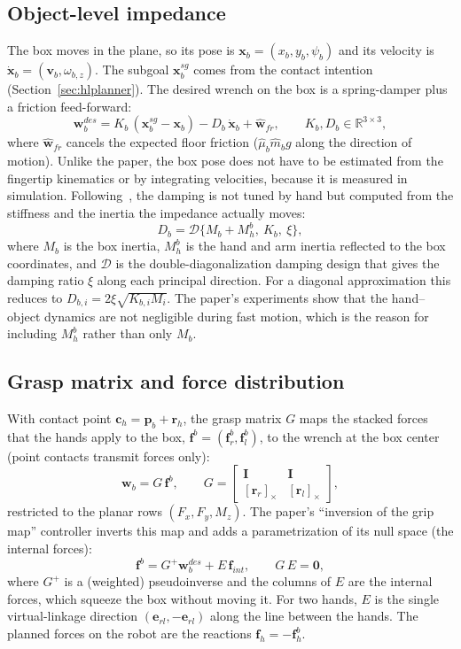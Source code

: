 \documentclass[11pt]{article}
\theoremstyle{remark}
\theoremstyle{definition}
\newcommand{\R}{\mathbb{R}}
\newcommand{\f}{\bm{f}}
\newcommand{\p}{\bm{p}}
\newcommand{\cc}{\bm{c}}
\newcommand{\I}{\bm{I}}
\newcommand{\zero}{\bm{0}}
\newcommand{\skewm}[1]{[#1]_\times}
\begin{document}
\subsection{Object-level impedance}
The box moves in the plane, so its pose is $\bm x_b=(x_b,y_b,\psi_b)$ and its velocity is
$\dot{\bm x}_b=(\bm v_b,\omega_{b,z})$. The subgoal $\bm x_b^{sg}$ comes from the contact intention
(Section~\ref{sec:hlplanner}). The desired wrench on the box is a spring-damper plus a friction feed-forward:
\begin{equation}
  \bm w_b^{des}=K_b\,(\bm x_b^{sg}-\bm x_b)-D_b\,\dot{\bm x}_b+\hat{\bm w}_{fr},
  \qquad K_b,D_b\in\R^{3\times3},
  \label{eq:objimp}
\end{equation}
where $\hat{\bm w}_{fr}$ cancels the expected floor friction ($\hat\mu_b\hat m_b g$ along the direction of motion).
Unlike the paper, the box pose does not have to be estimated from the fingertip kinematics or by integrating
velocities, because it is measured in simulation. Following~\cite{wimbock2012}, the damping is not tuned by hand but
computed from the stiffness and the inertia the impedance actually moves:
\begin{equation}
  D_b=\mathcal D\{M_b+M_h^b,\ K_b,\ \xi\},
\end{equation}
where $M_b$ is the box inertia, $M_h^b$ is the hand and arm inertia reflected to the box coordinates, and $\mathcal D$
is the double-diagonalization damping design that gives the damping ratio $\xi$ along each principal direction. For a
diagonal approximation this reduces to $D_{b,i}=2\xi\sqrt{K_{b,i}M_i}$. The paper's experiments show that the
hand--object dynamics are not negligible during fast motion, which is the reason for including $M_h^b$ rather than only $M_b$.

\subsection{Grasp matrix and force distribution}
With contact point $\cc_h=\p_b+\bm r_h$, the grasp matrix $G$ maps the stacked forces that the hands apply to the box,
$\bm f^b=(\bm f_r^b,\bm f_l^b)$, to the wrench at the box center (point contacts transmit forces only):
\begin{equation}
  \bm w_b=G\,\bm f^b,\qquad
  G=\begin{bmatrix}\I & \I\\ \skewm{\bm r_r} & \skewm{\bm r_l}\end{bmatrix},
\end{equation}
restricted to the planar rows $(F_x,F_y,M_z)$. The paper's ``inversion of the grip map'' controller inverts this map
and adds a parametrization of its null space (the internal forces):
\begin{equation}
  \bm f^b=G^+\bm w_b^{des}+E\,\bm f_{int},\qquad G\,E=\zero,
  \label{eq:gripinv}
\end{equation}
where $G^+$ is a (weighted) pseudoinverse and the columns of $E$ are the internal forces, which squeeze the box without
moving it. For two hands, $E$ is the single virtual-linkage direction $(\bm e_{rl},-\bm e_{rl})$ along the line between
the hands. The planned forces on the robot are the reactions $\f_h=-\bm f_h^b$.
\end{document}
